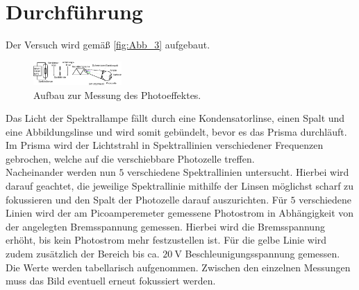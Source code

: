 \section{Durchführung}
\label{sec:Durchführung}

Der Versuch wird gemäß \autoref{fig:Abb_3} aufgebaut.
\begin{figure}[H]
    \centering
    \includegraphics[width=0.3\textwidth]{build/Abb_3.pdf}
    \caption{Aufbau zur Messung des Photoeffektes.\cite{V500}}
    \label{fig:Abb_3}
\end{figure}
Das Licht der Spektrallampe fällt durch eine Kondensatorlinse, einen Spalt und eine Abbildungslinse und wird 
somit gebündelt, bevor es das Prisma durchläuft.
Im Prisma wird der Lichtstrahl in Spektrallinien verschiedener Frequenzen gebrochen, welche auf die verschiebbare Photozelle treffen.\\
Nacheinander werden nun $5$ verschiedene Spektrallinien untersucht.
Hierbei wird darauf geachtet, die jeweilige Spektrallinie mithilfe der Linsen möglichst scharf zu fokussieren und den Spalt der
Photozelle darauf auszurichten.
Für $5$ verschiedene Linien wird der am Picoamperemeter gemessene Photostrom in Abhängigkeit von der angelegten Bremsspannung gemessen.
Hierbei wird die Bremsspannung erhöht, bis kein Photostrom mehr festzustellen ist.
Für die gelbe Linie wird zudem zusätzlich der Bereich bis ca. $\qty{20}{\volt}$ Beschleunigungsspannung gemessen.
Die Werte werden tabellarisch aufgenommen.
Zwischen den einzelnen Messungen muss das Bild eventuell erneut fokussiert werden.